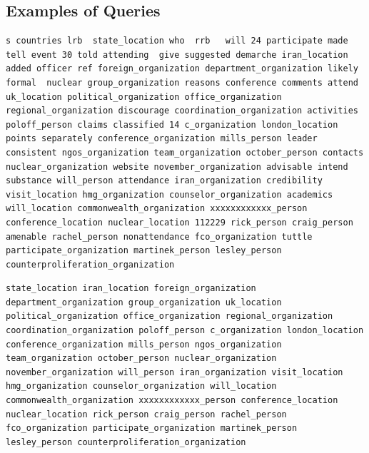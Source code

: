 \documentclass{l4proj}
\newenvironment{codelisting}{\captionsetup{type=listing}}{}
\begin{document}
\begin{appendices}
\chapter{Examples of Queries}
\begin{codelisting}
\begin{verbatim}
s countries lrb  state_location who  rrb   will 24 participate made tell event 30 told attending  give suggested demarche iran_location added officer ref foreign_organization department_organization likely formal  nuclear group_organization reasons conference comments attend uk_location political_organization office_organization regional_organization discourage coordination_organization activities poloff_person claims classified 14 c_organization london_location points separately conference_organization mills_person leader consistent ngos_organization team_organization october_person contacts nuclear_organization website november_organization advisable intend substance will_person attendance iran_organization credibility visit_location hmg_organization counselor_organization academics will_location commonwealth_organization xxxxxxxxxxxx_person conference_location nuclear_location 112229 rick_person craig_person amenable rachel_person nonattendance fco_organization tuttle participate_organization martinek_person lesley_person counterproliferation_organization
\end{verbatim}
\label{code:all_terms_query}
\end{codelisting}
\begin{codelisting}
\begin{verbatim}
state_location iran_location foreign_organization department_organization group_organization uk_location political_organization office_organization regional_organization coordination_organization poloff_person c_organization london_location conference_organization mills_person ngos_organization team_organization october_person nuclear_organization november_organization will_person iran_organization visit_location hmg_organization counselor_organization will_location commonwealth_organization xxxxxxxxxxxx_person conference_location nuclear_location rick_person craig_person rachel_person fco_organization participate_organization martinek_person lesley_person counterproliferation_organization
\end{verbatim}
\label{code:ne_query}
\end{codelisting}

\end{appendices}
\end{document}
